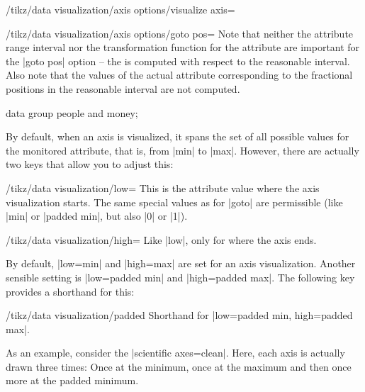 \begin{key}{/tikz/data visualization/axis options/visualize axis=}
\begin{key}{/tikz/data visualization/axis options/goto pos=}
        Note that neither the attribute range interval nor the transformation
        function for the attribute are important for the |goto pos| option --
        the  is computed with respect to the reasonable
        interval. Also note that the values of the actual attribute
        corresponding to the fractional positions in the reasonable interval
        are not computed.
\begin{codeexample}[
    preamble={\usetikzlibrary{datavisualization}},
    pre={\tikzdatavisualizationset{
  our system/.style={
    new Cartesian axis=x axis,
    new Cartesian axis=left axis,
    new Cartesian axis=right axis,
    x axis={attribute=x},
    left axis={unit vector={(0cm,1pt)}},
    right axis={unit vector={(0cm,1pt)}},
    x axis    ={length=\pgfkeysvalueof{/tikz/data visualization/scientific axes/width}},
    left axis ={length=\pgfkeysvalueof{/tikz/data visualization/scientific axes/height}},
    right axis={length=\pgfkeysvalueof{/tikz/data visualization/scientific axes/height}}
  }
}}]
\tikz \datavisualization [
    our system,
    x axis={attribute=time, length=4cm},
    left axis ={attribute=money},
    right axis={attribute=people},
    visualize as line/.list={people 1, people 2, money 1, money 2}]
  data group {people and money};
\end{codeexample}
    \end{key}

    By default, when an axis is visualized, it spans the set of all possible
    values for the monitored attribute, that is, from |min| to |max|. However,
    there are actually two keys that allow you to adjust this:
    \begin{key}{/tikz/data visualization/low=}
        This is the attribute value where the axis visualization starts. The
        same special values as for |goto| are permissible (like |min| or
        |padded min|, but also |0| or |1|).
    \end{key}
    \begin{key}{/tikz/data visualization/high=}
        Like |low|, only for where the axis ends.
    \end{key}

    By default, |low=min| and |high=max| are set for an axis visualization.
    Another sensible setting is |low=padded min| and |high=padded max|. The
    following key provides a shorthand for this:
    \begin{key}{/tikz/data visualization/padded}
        Shorthand for |low=padded min, high=padded max|.
    \end{key}
    As an example, consider the |scientific axes=clean|. Here, each axis is
    actually drawn three times: Once at the minimum, once at the maximum and
    then once more at the padded minimum.



\end{key}
